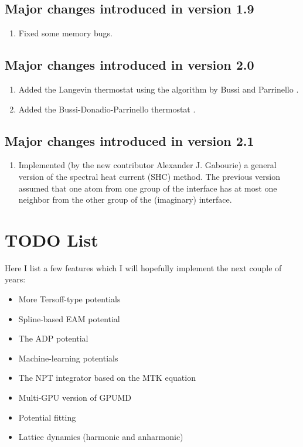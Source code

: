 \documentclass[12pt,a4paper]{report}
\begin{document}
\subsection{Major changes introduced in version 1.9}
\begin{enumerate}
\item Fixed some memory bugs.
\end{enumerate}

\subsection{Major changes introduced in version 2.0}
\begin{enumerate}
    \item Added the Langevin thermostat using the algorithm by Bussi and Parrinello \cite{bussi2007pre}.
    \item Added the Bussi-Donadio-Parrinello thermostat \cite{bussi2007jcp}.
\end{enumerate}

\subsection{Major changes introduced in version 2.1}
\begin{enumerate}
    \item Implemented (by the new contributor Alexander J. Gabourie) a general version of the spectral heat current (SHC) method. The previous version assumed that one atom from one group of the interface has at most one neighbor from the other group of the (imaginary) interface.
\end{enumerate}

\section{TODO List}

Here I list a few features which I will hopefully implement the next couple of years:
\begin{itemize}
\item More Tersoff-type potentials
\item Spline-based EAM potential
\item The ADP potential
\item Machine-learning potentials
\item The NPT integrator based on the MTK equation
\item Multi-GPU version of GPUMD
\item Potential fitting
\item Lattice dynamics (harmonic and anharmonic)
\end{itemize}
\end{document}
